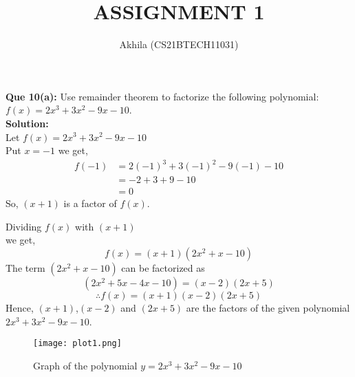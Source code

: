 \documentclass[12pt,twocolumn]{article}
\begin{document}
\large \title{ASSIGNMENT 1}
\author{Akhila (CS21BTECH11031)}
\maketitle
{\Large \textbf  {Que 10(a): }}
Use remainder theorem to factorize the following polynomial:\\
$f(x)=2x^3+3x^2-9x-10$.\\


{\Large \textbf  {Solution:}}\\
Let $f(x)=2x^3+3x^2-9x-10$ \\
Put $x=-1$ we get,
\begin{align*}
f(-1) & =2(-1)^3+3(-1)^2-9(-1)-10\\
      & =-2+3+9-10\\ 
      & =0
\end{align*}
So, $(x+1)$ is a factor of $f(x)$.

Dividing $f(x)$ with $(x+1)$\\ 
 we get,
\begin{equation*}
    f(x)=(x+1)(2x^2+x-10)
\end{equation*}
The term $(2x^2+x-10)$ can be factorized as
\begin{equation*}
    (2x^2+5x-4x-10)=(x-2)(2x+5)
\end{equation*}
\begin{equation*}
    \therefore f(x)=(x+1)(x-2)(2x+5)
\end{equation*}
Hence,  $(x+1)$,$(x-2)$ and $(2x+5)$  are the factors of the given polynomial\\
$2x^3+3x^2-9x-10$.
\begin{figure}[H]
    \centering
    \texttt{[image: plot1.png]}
    \captionsetup{justification=centering,margin=1cm}
    \caption{Graph of the polynomial $y=2x^3+3x^2-9x-10$}
    \label{fig:plot1}
\end{figure}
\end{document}
